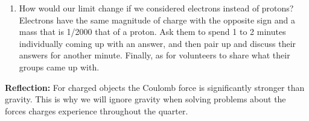 \documentclass{article}
\begin{document}
\begin{enumerate}
\item How would our limit change if we considered electrons instead of protons? Electrons have the same magnitude of charge with the opposite sign and a mass that is 1/2000 that of a proton. Ask them to spend 1 to 2 minutes individually coming up with an answer, and then pair up and discuss their answers for another minute. Finally, as for volunteers to share what their groups came up with.
\end{enumerate}

\textbf{Reflection:} For charged objects the Coulomb force is significantly stronger than gravity. This is why we will ignore gravity when solving problems about the forces charges experience throughout the quarter.

\hspace{14pt}
\end{document}
